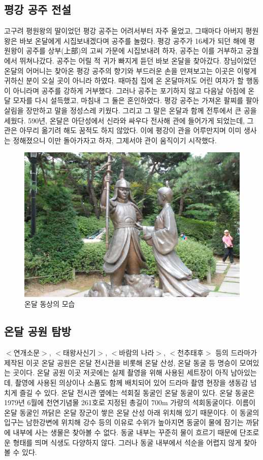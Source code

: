 \subsection{평강 공주 전설}
고구려 평원왕의 딸이었던 평강 공주는 어려서부터 자주 울었고, 그때마다 아버지 평원왕은 바보 온달에게 시집보내겠다며 공주를 놀렸다. 
평강 공주가 16세가 되던 해에 평원왕이 공주를 상부(上部)의 고씨 가문에 시집보내려 하자, 
공주는 이를 거부하고 궁궐에서 뛰쳐나갔다. 공주는 어릴 적 귀가 빠지게 듣던 바보 온달을 찾아갔다. 
장님이었던 온달의 어머니는 찾아온 평강 공주의 향기와 부드러운 손을 만져보고는 이곳은 이렇게 귀하신 분이 오실 곳이 아니라 하였다. 
때마침 집에 온 온달마저도 어린 여자가 할 행동이 아니라며 공주를 강하게 거부했다. 
그러나 공주는 포기하지 않고 다음날 아침에 온달 모자를 다시 설득했고, 마침내 그 둘은 혼인하였다. 
평강 공주는 가져온 팔찌를 팔아 살림을 장만하고 말을 정성스레 키웠다. 그리고 그 말은 온달과 함께 전투에서 큰 공을 세웠다. 
590년, 온달은 아단성에서 신라와 싸우다 전사해 관에 들어가게 되었는데, 
그 관은 아무리 옮기려 해도 꿈적도 하지 않았다. 
이에 평강이 관을 어루만지며 이미 생사는 정해졌으니 이만 돌아가자고 하자, 그제서야 관이 움직이기 시작했다. 


\begin{figure}[ht]
    \centering
    \includegraphics[width=.6\textwidth]{s_img/온달_사진.jpg}
    \caption{온달 동상의 모습}
    \label{fig:my_label_s4}
 \end{figure}

\subsection{온달 공원 탐방}
$<$연개소문$>$, $<$태왕사신기$>$, $<$바람의 나라$>$, $<$천추태후$>$ 등의 드라마가 제작된 이곳 온달 공원은 
온달 전시관을 비롯해 온달 산성, 온달 동굴 등 명승이 모여있는 곳이다. 
온달 공원 이곳 저곳에는 실제 촬영을 위해 사용된 세트장이 아직 남아있는데, 촬영에 사용된 의상이나 소품도 함께 배치되어 있어 
드라마 촬영 현장을 생동감 넘치게 즐길 수 있다. 
온달 전시관 옆에는 석회질 동굴인 온달 동굴이 있다. 
온달 동굴은 1979년 6월에 천연기념물 261호로 지정된 총길이 700m 가량의 석회동굴이다. 
이름이 온달 동굴인 까닭은 온달 장군이 쌓은 온달 산성 아래 위치해 있기 때문이다. 
이 동굴의 입구는 남한강변에 위치해 강수 등의 이유로 수위가 높아지면 동굴이 물에 잠기는 까닭에 내부에 사는 생물은 찾아볼 수 없다. 
동굴 내부는 꾸준히 물이 흐르기 때문에 단조로운 형태를 띄며 식생도 다양하지 않다. 
그러나 동굴 내부에서 석순을 어렵지 않게 찾아볼 수 있다. 


